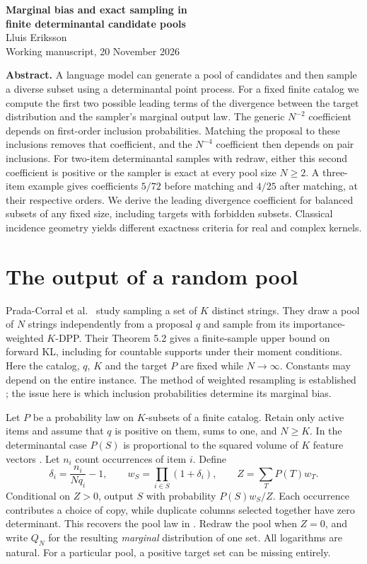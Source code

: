 \documentclass[11pt]{article}
\begin{document}
\begin{center}{\LARGE\bfseries Marginal bias and exact sampling in\\[3pt] finite determinantal candidate pools}\\[7pt]
Lluis Eriksson\\[2pt]\small Working manuscript, 20 November 2026\end{center}
\textbf{Abstract.} A language model can generate a pool of candidates and then sample a diverse subset using a determinantal point process. For a fixed finite catalog we compute the first two possible leading terms of the divergence between the target distribution and the sampler's marginal output law. The generic $N^{-2}$ coefficient depends on first-order inclusion probabilities. Matching the proposal to these inclusions removes that coefficient, and the $N^{-4}$ coefficient then depends on pair inclusions. For two-item determinantal samples with redraw, either this second coefficient is positive or the sampler is exact at every pool size $N\ge2$. A three-item example gives coefficients $5/72$ before matching and $4/25$ after matching, at their respective orders. We derive the leading divergence coefficient for balanced subsets of any fixed size, including targets with forbidden subsets. Classical incidence geometry yields different exactness criteria for real and complex kernels.

\section{The output of a random pool}
Prada-Corral et al.\ \cite{pool} study sampling a set of $K$ distinct strings. They draw a pool of $N$ strings independently from a proposal $q$ and sample from its importance-weighted $K$-DPP. Their Theorem 5.2 gives a finite-sample upper bound on forward KL, including for countable supports under their moment conditions. Here the catalog, $q$, $K$ and the target $P$ are fixed while $N\to\infty$. Constants may depend on the entire instance. The method of weighted resampling is established \cite{kviman}; the issue here is which inclusion probabilities determine its marginal bias.

Let $P$ be a probability law on $K$-subsets of a finite catalog. Retain only active items and assume that $q$ is positive on them, sums to one, and $N\ge K$. In the determinantal case $P(S)$ is proportional to the squared volume of $K$ feature vectors \cite{kt}. Let $n_i$ count occurrences of item $i$. Define
\[
 \delta_i=\frac{n_i}{Nq_i}-1,\qquad
 w_S=\prod_{i\in S}(1+\delta_i),\qquad Z=\sum_T P(T)w_T.
\]
Conditional on $Z>0$, output $S$ with probability $P(S)w_S/Z$. Each occurrence contributes a choice of copy, while duplicate columns selected together have zero determinant. This recovers the pool law in \cite{pool}. Redraw the pool when $Z=0$, and write $Q_N$ for the resulting \emph{marginal} distribution of one set. All logarithms are natural. For a particular pool, a positive target set can be missing entirely.
\end{document}
